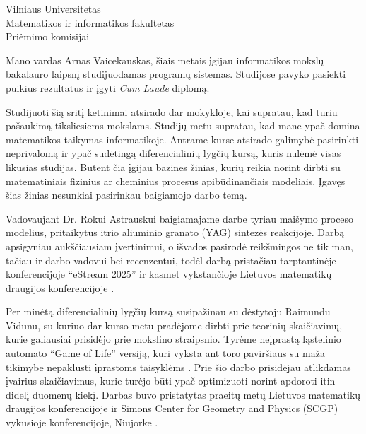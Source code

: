 \documentclass[]{VUMIFTemplateClass}
\begin{document}
\thispagestyle{empty}

\begin{flushright}
Vilniaus Universitetas \\
Matematikos ir informatikos fakultetas \\
Priėmimo komisijai
\end{flushright}

\vspace{1cm}

Mano vardas Arnas Vaicekauskas, šiais metais įgijau informatikos mokslų bakalauro laipsnį studijuodamas programų sistemas. Studijose pavyko pasiekti puikius rezultatus ir įgyti \textit{Cum Laude} diplomą.

Studijuoti šią sritį ketinimai atsirado dar mokykloje, kai supratau, kad turiu pašaukimą tiksliesiems mokslams. Studijų metu 
supratau, kad mane ypač domina matematikos taikymas informatikoje. Antrame kurse atsirado galimybė pasirinkti neprivalomą ir ypač sudėtingą diferencialinių lygčių kursą, kuris nulėmė visas likusias studijas. Būtent čia įgijau bazines žinias, kurių reikia norint dirbti su matematiniais fizinius ar cheminius procesus apibūdinančiais modeliais. Įgavęs šias žinias nesunkiai pasirinkau baigiamojo darbo temą.

Vadovaujant Dr. Rokui Astrauskui baigiamajame darbe tyriau maišymo proceso modelius, pritaikytus itrio aliuminio granato (YAG) sintezės reakcijoje. Darbą apsigyniau aukščiausiam įvertinimui, o išvados pasirodė reikšmingos ne tik man, tačiau ir darbo vadovui bei recenzentui, todėl darbą pristačiau tarptautinėje konferencijoje \enquote{eStream 2025} ir kasmet vykstančioje Lietuvos matematikų draugijos konferencijoje \cite{LietuvosMatematikuDraugijos}.

Per minėtą diferencialinių lygčių kursą susipažinau su dėstytoju Raimundu Vidunu, su kuriuo dar kurso metu pradėjome dirbti prie teorinių skaičiavimų, kurie galiausiai prisidėjo prie mokslino straipsnio. Tyrėme neįprastą ląstelinio automato \enquote{Game of Life} versiją, kuri vyksta ant toro paviršiaus su maža tikimybe nepaklusti įprastoms taisyklėms \cite{vidunasConwaysGameLife2025}. Prie šio darbo prisidėjau atlikdamas įvairius skaičiavimus, kurie turėjo būti ypač optimizuoti norint apdoroti itin didelį duomenų kiekį. Darbas buvo pristatytas praeitų metų Lietuvos matematikų draugijos konferencijoje \cite{stikonasKONFERENCIJOSPROGRAMINISKOMITETAS2024} ir Simons Center for Geometry and Physics (SCGP) vykusioje konferencijoje, Niujorke \cite{MurmurationsArithmeticGeometry}.
\end{document}
